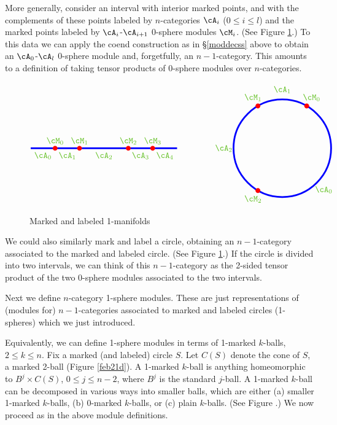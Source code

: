 More generally, consider an interval with interior marked points, and with the complements
of these points labeled by $n$-categories $\cA_i$ ($0\le i\le l$) and the marked points labeled
by $\cA_i$-$\cA_{i+1}$ 0-sphere modules $\cM_i$.
(See Figure \ref{feb21c}.)
To this data we can apply the coend construction as in \S\ref{moddecss} above
to obtain an $\cA_0$-$\cA_l$ $0$-sphere module and, forgetfully, an $n{-}1$-category.
This amounts to a definition of taking tensor products of $0$-sphere modules over $n$-categories.

\begin{figure}[t]
$$
\begin{tikzpicture}[baseline,line width = 2pt]
\draw[blue] (0,0) -- (6,0);
\foreach \x/\n in {0.5/0,1.5/1,3/2,4.5/3,5.5/4} {
	\path (\x,0)  node[below] {\color{green!50!brown}$\cA_{\n}$};
}
\foreach \x/\n in {1/0,2/1,4/2,5/3} {
	\fill[red] (\x,0) circle (0.1) node[above] {\color{green!50!brown}$\cM_{\n}$};
}
\end{tikzpicture}
\qquad
\qquad
\begin{tikzpicture}[baseline,line width = 2pt]
\draw[blue] (0,0) circle (2);
\foreach \q/\n in {-45/0,90/1,180/2} {
	\path (\q:2.4)  node {\color{green!50!brown}$\cA_{\n}$};
}
\foreach \q/\n in {60/0,120/1,-120/2} {
	\fill[red] (\q:2) circle (0.1);
	\path (\q:2.4) node {\color{green!50!brown}$\cM_{\n}$};
}
\end{tikzpicture}
$$
\caption{Marked and labeled 1-manifolds}
\label{feb21c}
\end{figure}

We could also similarly mark and label a circle, obtaining an $n{-}1$-category
associated to the marked and labeled circle.
(See Figure \ref{feb21c}.)
If the circle is divided into two intervals, we can think of this $n{-}1$-category
as the 2-sided tensor product of the two 0-sphere modules associated to the two intervals.

\medskip

Next we define $n$-category 1-sphere modules.
These are just representations of (modules for) $n{-}1$-categories associated to marked and labeled 
circles (1-spheres) which we just introduced.

Equivalently, we can define 1-sphere modules in terms of 1-marked $k$-balls, $2\le k\le n$.
Fix a marked (and labeled) circle $S$.
Let $C(S)$ denote the cone of $S$, a marked 2-ball (Figure \ref{feb21d}).
A 1-marked $k$-ball is anything homeomorphic to $B^j \times C(S)$, $0\le j\le n-2$, 
where $B^j$ is the standard $j$-ball.
A 1-marked $k$-ball can be decomposed in various ways into smaller balls, which are either 
(a) smaller 1-marked $k$-balls, (b) 0-marked $k$-balls, or (c) plain $k$-balls.
(See Figure .)
We now proceed as in the above module definitions.

